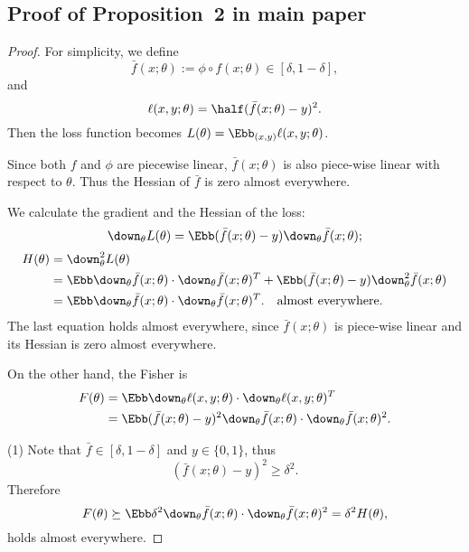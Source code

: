 \documentclass{article}
\begin{document}
\subsection{Proof of Proposition~2 in main paper}
\begin{proof}
For simplicity, we define 
\begin{equation}
    \bar{f}(x;\theta) := \phi\circ f(x;\theta) \in [\delta, 1-\delta],
\end{equation}
and
\begin{equation}
    \ell (x,y; \theta) = \half (\bar{f}(x;\theta) - y)^2.    
\end{equation}
Then the loss function becomes $L(\theta) = \Ebb_{(x,y)} \ell(x,y;\theta)$.

Since both $f$ and $\phi$ are piecewise linear, $\bar{f}(x;\theta)$ is also piece-wise linear with respect to $\theta$.
Thus the Hessian of $\bar{f}$ is zero almost everywhere.

We calculate the gradient and the Hessian of the loss:
\begin{equation}
    \down_{\theta} L(\theta) = \Ebb (\bar{f}(x;\theta) - y) \down_{\theta} \bar{f}(x;\theta);
\end{equation}
\begin{align}
    H(\theta) &= \down^2_{\theta} L(\theta) \\
    &= \Ebb \down_{\theta} \bar{f} (x;\theta) \cdot \down_{\theta} \bar{f} (x;\theta)^T + \Ebb (\bar{f}(x;\theta)-y)\down^2_{\theta} \bar{f}(x;\theta) \\
    &= \Ebb \down_{\theta} \bar{f} (x;\theta) \cdot \down_{\theta} \bar{f} (x;\theta)^T. \quad \text{almost everywhere.}
\end{align}
The last equation holds almost everywhere, since $\bar{f}(x;\theta)$ is piece-wise linear and its Hessian is zero almost everywhere. 

On the other hand, the Fisher is
\begin{align}
    F(\theta) &= \Ebb \down_{\theta} \ell(x,y;\theta) \cdot \down_{\theta} \ell(x,y;\theta)^T \\
    &= \Ebb (\bar{f}(x;\theta) - y)^2 \down_{\theta} \bar{f}(x;\theta) \cdot \down_{\theta} \bar{f}(x;\theta)^2.
\end{align}

(1)
Note that $\bar{f} \in [\delta, 1-\delta]$ and $y\in \{0,1\}$, thus
\begin{equation}
    (\bar{f}(x;\theta) - y)^2 \ge \delta^2. 
\end{equation}
Therefore
\begin{equation}
    F(\theta) \succeq \Ebb \delta^2 \down_{\theta} \bar{f}(x;\theta) \cdot \down_{\theta} \bar{f}(x;\theta)^2 = \delta^2 H(\theta),
\end{equation}
holds almost everywhere.


\end{proof}
\end{document}
